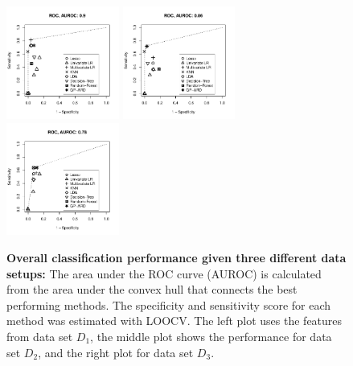 \documentclass{article}
\begin{document}
%
%

\begin{figure}
\includegraphics[width=0.33\textwidth]{Results/roc_curve_datatest1.pdf} \hspace{-0.3cm} 
\includegraphics[width=0.33\textwidth]{Results/roc_curve_datatest2.pdf} \hspace{-0.3cm}
\includegraphics[width=0.33\textwidth]{Results/roc_curve_datatest3.pdf}
\caption{
  \label{fig:rocfinal}\textbf{Overall classification performance given three different data setups:} The area under the ROC curve (AUROC) is calculated from the area under the convex hull that connects the best performing methods. The specificity and sensitivity score for each method was estimated with LOOCV. The left plot uses the features from data set $D_1$, the middle plot shows the performance for data set $D_2$, and the right plot for data set $D_3$.}
\end{figure}
\end{document}
